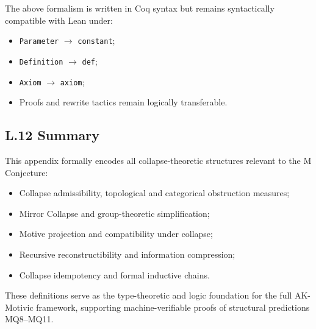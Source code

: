 \documentclass[11pt]{article}
\begin{document}
The above formalism is written in Coq syntax but remains syntactically compatible with Lean under:

\begin{itemize}
    \item \texttt{Parameter} $\to$ \texttt{constant};
    \item \texttt{Definition} $\to$ \texttt{def};
    \item \texttt{Axiom} $\to$ \texttt{axiom};
    \item Proofs and rewrite tactics remain logically transferable.
\end{itemize}

\subsection*{L.12 Summary}

This appendix formally encodes all collapse-theoretic structures relevant to the M Conjecture:

\begin{itemize}
    \item Collapse admissibility, topological and categorical obstruction measures;
    \item Mirror Collapse and group-theoretic simplification;
    \item Motive projection and compatibility under collapse;
    \item Recursive reconstructibility and information compression;
    \item Collapse idempotency and formal inductive chains.
\end{itemize}

These definitions serve as the type-theoretic and logic foundation for the full AK-Motivic framework, supporting machine-verifiable proofs of structural predictions MQ8–MQ11.

\FloatBarrier
\end{document}

